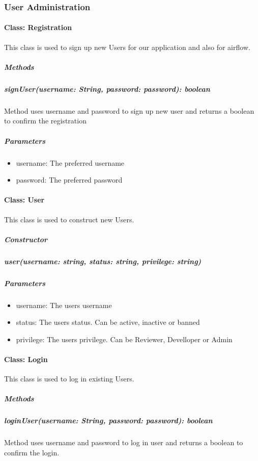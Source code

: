\subsubsection{User Administration}


\paragraph{Class: Registration}
This class is used to sign up new Users for our application and also for airflow.
\subparagraph{Methods}

\subparagraph{signUser(username: String, password: password): boolean}

Method uses username and password to sign up new user and returns a boolean to confirm the registration

\subparagraph{Parameters}
\begin{itemize}
	\item{username:}
	The preferred username
	\item{password:}
	The preferred password
\end{itemize}



\paragraph{Class: User}
This class is used to construct new Users.
\subparagraph{Constructor}

\subparagraph{user(username: string, status: string, privilege: string)}

\subparagraph{Parameters}

\begin{itemize}
	\item{username:}
	The users username
	\item{status:}
	The users status. Can be active, inactive or banned
	\item{privilege:}
	The users privilege. Can be Reviewer, Develloper or Admin
\end{itemize}



\paragraph{Class: Login}
This class is used to log in existing Users.
\subparagraph{Methods}

\subparagraph{loginUser(username: String, password: password): boolean}

Method uses username and password to log in user and returns a boolean to confirm the login.


